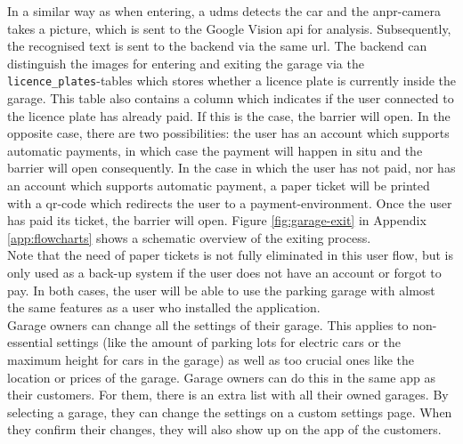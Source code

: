 \ind In a similar way as when entering, a \ac{udms} detects the car and the \ac{anpr}-camera takes a picture, which is sent to the Google Vision \ac{api} for analysis. Subsequently, the recognised text is sent to the backend via the same \ac{url}. The backend can distinguish the images for entering and exiting the garage via the \verb|licence_plates|-tables which stores whether a licence plate is currently inside the garage. This table also contains a column which indicates if the user connected to the licence plate has already paid. If this is the case, the barrier will open. In the opposite case, there are two possibilities: the user has an account which supports automatic payments, in which case the payment will happen in situ and the barrier will open consequently. In the case in which the user has not paid, nor has an account which supports automatic payment, a paper ticket will be printed with a \ac{qr}-code which redirects the user to a payment-environment. Once the user has paid its ticket, the barrier will open. Figure \ref{fig:garage-exit} in Appendix \ref{app:flowcharts} shows a schematic overview of the exiting process. \\


Note that the need of paper tickets is not fully eliminated in this user flow, but is only used as a back-up system if the user does not have an account or forgot to pay. In both cases, the user will be able to use the parking garage with almost the same features as a user who installed the application. \\

Garage owners can change all the settings of their garage. This applies to non-essential settings (like the amount of parking lots for electric cars or the maximum height for cars in the garage) as well as too crucial ones like the location or prices of the garage. Garage owners can do this in the same app as their customers. For them, there is an extra list with all their owned garages. By selecting a garage, they can change the settings on a custom settings page. When they confirm their changes, they will also show up on the app of the customers. \\ %